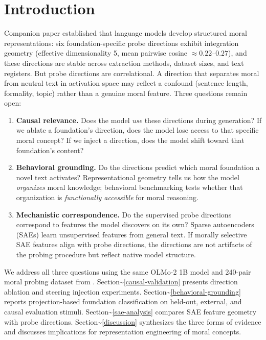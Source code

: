\section{Introduction}\label{introduction}

Companion paper \citep{reblitzrichardson2026geometry} established that language models develop structured moral representations: six foundation-specific probe directions exhibit integration geometry (effective dimensionality 5, mean pairwise cosine \(\approx 0.22\)--\(0.27\)), and these directions are stable across extraction methods, dataset sizes, and text registers.
But probe directions are correlational.
A direction that separates moral from neutral text in activation space may reflect a confound (sentence length, formality, topic) rather than a genuine moral feature.
Three questions remain open:

\begin{enumerate}
\def\labelenumi{\arabic{enumi}.}
\item
  \textbf{Causal relevance.} Does the model \emph{use} these directions during generation? If we ablate a foundation's direction, does the model lose access to that specific moral concept? If we inject a direction, does the model shift toward that foundation's content?
\item
  \textbf{Behavioral grounding.} Do the directions predict which moral foundation a novel text activates? Representational geometry tells us how the model \emph{organizes} moral knowledge; behavioral benchmarking tests whether that organization is \emph{functionally accessible} for moral reasoning.
\item
  \textbf{Mechanistic correspondence.} Do the supervised probe directions correspond to features the model discovers on its own? Sparse autoencoders (SAEs) learn unsupervised features from general text. If morally selective SAE features align with probe directions, the directions are not artifacts of the probing procedure but reflect native model structure.
\end{enumerate}

We address all three questions using the same OLMo-2 1B model and 240-pair moral probing dataset from \citet{reblitzrichardson2026geometry}.
Section\textasciitilde{}\ref{causal-validation} presents direction ablation and steering injection experiments.
Section\textasciitilde{}\ref{behavioral-grounding} reports projection-based foundation classification on held-out, external, and causal evaluation stimuli.
Section\textasciitilde{}\ref{sae-analysis} compares SAE feature geometry with probe directions.
Section\textasciitilde{}\ref{discussion} synthesizes the three forms of evidence and discusses implications for representation engineering of moral concepts.
